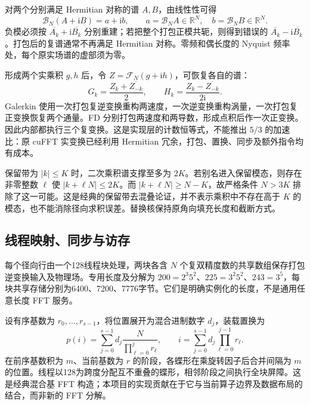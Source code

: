 对两个分别满足 Hermitian 对称的谱 \(A,B\)，由线性性可得
\begin{equation}
\label{eq:op-inverse-pack}
\mathcal B_N(A+\mathrm{i}B)=a+\mathrm{i}b,
\qquad a=\mathcal B_N A\in\mathbb R^N,\quad b=\mathcal B_N B\in\mathbb R^N.
\end{equation}
负模必须按 \(\overline{A_k}+\mathrm{i}\overline{B_k}\) 分别重建；若把整个打包正模共轭，则得到错误的 \(\overline{A_k}-\mathrm{i}\overline{B_k}\)。打包后的复谱通常不再满足 Hermitian 对称。零频和偶长度的 Nyquist 频率处，每个原实场谱的虚部须为零。

形成两个实乘积 \(g,h\) 后，令 \(Z=\mathcal F_N(g+\mathrm{i}h)\)，可恢复各自的谱：
\begin{equation}
\label{eq:op-forward-pack}
G_k=\frac{Z_k+\overline{Z_{-k}}}{2},\qquad
H_k=\frac{Z_k-\overline{Z_{-k}}}{2\mathrm{i}}.
\end{equation}
Galerkin 使用一次打包复逆变换重构两速度，一次逆变换重构涡量，一次打包复正变换恢复两个通量。FD 分别打包两速度和两导数，形成点积后作一次正变换。因此内部都执行三个复变换。这是实现层的计数恒等式，不能推出 \(5/3\) 的加速比：原 cuFFT 实变换已经利用 Hermitian 冗余，打包、置换、同步及额外指令均有成本。

保留带为 \(|k|\le K\) 时，二次乘积谱支撑至多为 \(2K\)。若别名进入保留模态，则存在非零整数 \(\ell\) 使 \(|k+\ell N|\le2K\)。而 \(|k+\ell N|\ge N-K\)，故严格条件 \(N>3K\) 排除了这一可能。这是经典的保留带去混叠论证\cite{r13}，并不表示乘积中不存在高于 \(K\) 的模态，也不能消除径向求积误差。替换核保持原角向填充长度和截断方式。

\subsection{线程映射、同步与访存}

每个径向行由一个128线程块处理，两块各含 \(N\) 个复双精度数的共享数组保存打包逆变换输入及物理场。专用长度及分解为 \(200=2^3 5^2\)、\(225=3^2 5^2\)、\(243=3^5\)，每块共享存储分别为6400、7200、7776字节。它们是明确实例化的长度，不是通用任意长度 FFT 服务。

设有序基数为 \(r_0,\ldots,r_{s-1}\)，将位置展开为混合进制数字 \(d_j\)，装载置换为
\begin{equation}
\label{eq:op-permutation}
p(i)=\sum_{j=0}^{s-1}d_j\frac{N}{\prod_{\ell=0}^{j}r_\ell},\qquad
i=\sum_{j=0}^{s-1}d_j\prod_{\ell=0}^{j-1}r_\ell.
\end{equation}
在前序基数积为 \(m\)、当前基数为 \(r\) 的阶段，各蝶形在乘旋转因子后合并间隔为 \(m\) 的位置。线程以128为跨度分配互不重叠的蝶形，相邻阶段之间执行全块屏障。这是经典混合基 FFT 构造；本项目的实现贡献在于它与当前算子边界及数据布局的结合，而非新的 FFT 分解。

